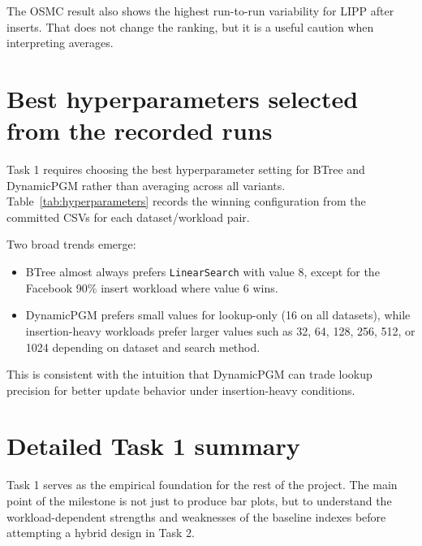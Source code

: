 \documentclass[11pt]{article}
\begin{document}
The OSMC result also shows the highest run-to-run variability for LIPP after inserts.
That does not change the ranking, but it is a useful caution when interpreting averages.

\section{Best hyperparameters selected from the recorded runs}

Task 1 requires choosing the best hyperparameter setting for BTree and DynamicPGM rather
than averaging across all variants. Table~\ref{tab:hyperparameters} records the winning
configuration from the committed CSVs for each dataset/workload pair.

\begin{table}[H]
    \centering
    \caption{Best hyperparameter setting selected for each dataset/workload pair.}
    \label{tab:hyperparameters}
    \footnotesize
    
\end{table}

Two broad trends emerge:
\begin{itemize}[leftmargin=1.5em]
    \item BTree almost always prefers \texttt{LinearSearch} with value 8, except for the
    Facebook 90\% insert workload where value 6 wins.
    \item DynamicPGM prefers small values for lookup-only (16 on all datasets), while
    insertion-heavy workloads prefer larger values such as 32, 64, 128, 256, 512, or
    1024 depending on dataset and search method.
\end{itemize}

This is consistent with the intuition that DynamicPGM can trade lookup precision for
better update behavior under insertion-heavy conditions.

\section{Detailed Task 1 summary}

Task 1 serves as the empirical foundation for the rest of the project. The main point of
the milestone is not just to produce bar plots, but to understand the workload-dependent
strengths and weaknesses of the baseline indexes before attempting a hybrid design in
Task 2.
\end{document}
